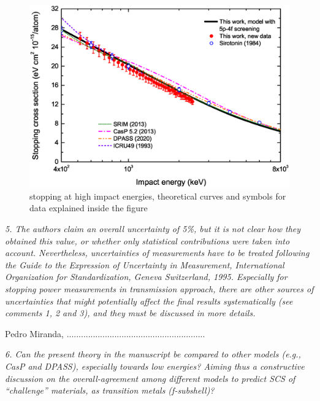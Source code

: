 \documentclass[a4paper,10pt]{article}
\begin{document}
\begin{figure}[!t]
\centering
\includegraphics[width=12.cm]{Fig04.eps}
\caption{stopping at high impact energies, theoretical curves and symbols for data explained inside the figure}
\label{highE}
\end{figure}

\vspace{0.25cm}
\textsl{5. The authors claim an overall uncertainty of 5\%, but it is not clear
how they obtained this value, or whether only statistical
contributions were taken into account. Nevertheless, uncertainties of
measurements have to be treated following the Guide to the Expression
of Uncertainty in Measurement, International Organization for
Standardization, Geneva Switzerland, 1995. Especially for stopping
power measurements in transmission approach, there are other sources
of uncertainties that might potentially affect the final results
systematically (see comments 1, 2 and 3), and they must be discussed
in more details.}

\vspace{0.1cm}
{\color{red} Pedro Miranda, ..........................................................}
\vspace{0.2cm}

\vspace{0.25cm}
\textsl{6. Can the present theory in the manuscript be compared to other
models (e.g., CasP and DPASS), especially towards low energies? Aiming
thus a constructive discussion on the overall-agreement among
different models to predict SCS of “challenge” materials, as
transition metals (f-subshell)?}
\end{document}
